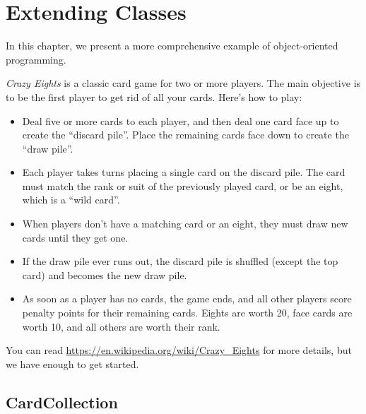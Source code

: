 \chapter{Extending Classes}
\label{extending-classes}
\label{eights}


In this chapter, we present a more comprehensive example of object-oriented programming.

{\it Crazy Eights} is a classic card game for two or more players.
The main objective is to be the first player to get rid of all your cards.
Here's how to play:

\begin{itemize}

\item Deal five or more cards to each player, and then deal one card face up to create the ``discard pile''.
Place the remaining cards face down to create the ``draw pile''.

\item Each player takes turns placing a single card on the discard pile.
The card must match the rank or suit of the previously played card, or be an eight, which is a ``wild card''.

\item When players don't have a matching card or an eight, they must draw new cards until they get one.

\item If the draw pile ever runs out, the discard pile is shuffled (except the top card) and becomes the new draw pile.

\item As soon as a player has no cards, the game ends, and all other players score penalty points for their remaining cards.
Eights are worth 20, face cards are worth 10, and all others are worth their rank.

\end{itemize}

You can read \url{https://en.wikipedia.org/wiki/Crazy_Eights} for more details, but we have enough to get started.



\section{CardCollection}
\label{extending-classes_cardcollection}

